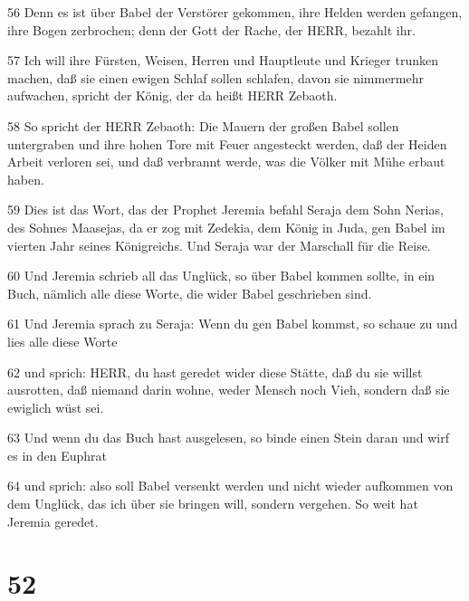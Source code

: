 \par 56 Denn es ist über Babel der Verstörer gekommen, ihre Helden werden gefangen, ihre Bogen zerbrochen; denn der Gott der Rache, der HERR, bezahlt ihr.
\par 57 Ich will ihre Fürsten, Weisen, Herren und Hauptleute und Krieger trunken machen, daß sie einen ewigen Schlaf sollen schlafen, davon sie nimmermehr aufwachen, spricht der König, der da heißt HERR Zebaoth.
\par 58 So spricht der HERR Zebaoth: Die Mauern der großen Babel sollen untergraben und ihre hohen Tore mit Feuer angesteckt werden, daß der Heiden Arbeit verloren sei, und daß verbrannt werde, was die Völker mit Mühe erbaut haben.
\par 59 Dies ist das Wort, das der Prophet Jeremia befahl Seraja dem Sohn Nerias, des Sohnes Maasejas, da er zog mit Zedekia, dem König in Juda, gen Babel im vierten Jahr seines Königreichs. Und Seraja war der Marschall für die Reise.
\par 60 Und Jeremia schrieb all das Unglück, so über Babel kommen sollte, in ein Buch, nämlich alle diese Worte, die wider Babel geschrieben sind.
\par 61 Und Jeremia sprach zu Seraja: Wenn du gen Babel kommst, so schaue zu und lies alle diese Worte
\par 62 und sprich: HERR, du hast geredet wider diese Stätte, daß du sie willst ausrotten, daß niemand darin wohne, weder Mensch noch Vieh, sondern daß sie ewiglich wüst sei.
\par 63 Und wenn du das Buch hast ausgelesen, so binde einen Stein daran und wirf es in den Euphrat
\par 64 und sprich: also soll Babel versenkt werden und nicht wieder aufkommen von dem Unglück, das ich über sie bringen will, sondern vergehen. So weit hat Jeremia geredet.

\chapter{52}

